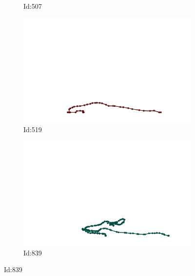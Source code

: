 \documentclass[12pt,twoside]{report}
\begin{document}
\begin{figure}
\begin{subfigure}[b]{0.20\textwidth}
\caption{Id:507}
\end{subfigure}
\begin{subfigure}[b]{0.20\textwidth}
\centering
\includegraphics[width=\textwidth]{../../trajectories/519.png}
\caption{Id:519}
\end{subfigure}
\begin{subfigure}[b]{0.20\textwidth}
\centering
\includegraphics[width=\textwidth]{../../trajectories/839.png}
\caption{Id:839}
\end{subfigure}
\end{figure}
\end{document}
